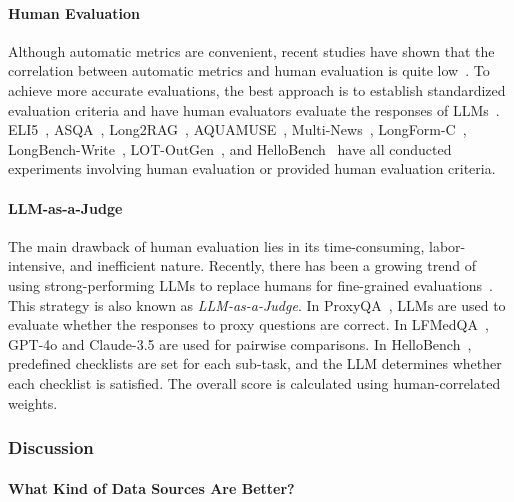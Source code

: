 \documentclass[11pt, a4paper, logo, copyright, nonumbering]{map}
\begin{document}
\paragraph{Human Evaluation}

Although automatic metrics are convenient, recent studies have shown that the correlation between automatic metrics and human evaluation is quite low~\citep{krishna2021hurdles,xu2023critical}. 
To achieve more accurate evaluations, the best approach is to establish standardized evaluation criteria and have human evaluators evaluate the responses of LLMs~\citep{ruan2024defining}. ELI5~\citep{fan2019eli5}, ASQA~\citep{stelmakh2022asqa}, Long2RAG~\citep{qi2024long2rag}, AQUAMUSE~\citep{kulkarni2020aquamuse}, Multi-News~\citep{fabbri2019multi}, LongForm-C~\citep{koksal2023longform}, LongBench-Write~\citep{bai2024longwriter}, LOT-OutGen~\citep{guan2022lot}, and HelloBench~\citep{que2024hellobench} have all conducted experiments involving human evaluation or provided human evaluation criteria.

\paragraph{LLM-as-a-Judge}

The main drawback of human evaluation lies in its time-consuming, labor-intensive, and inefficient nature. Recently, there has been a growing trend of using strong-performing LLMs to replace humans for fine-grained evaluations~\citep{zheng2023judging}. 
This strategy is also known as \textit{LLM-as-a-Judge}. 
In ProxyQA~\citep{tan2024proxyqa}, LLMs are used to evaluate whether the responses to proxy questions are correct. In LFMedQA~\citep{jeong2024olaph}, GPT-4o and Claude-3.5 are used for pairwise comparisons.
In HelloBench~\citep{que2024hellobench}, predefined checklists are set for each sub-task, and the LLM determines whether each checklist is satisfied. The overall score is calculated using human-correlated weights.

\subsubsection{Discussion}
\label{sec:long-form-discussion}

\paragraph{What Kind of Data Sources Are Better?}
\end{document}
